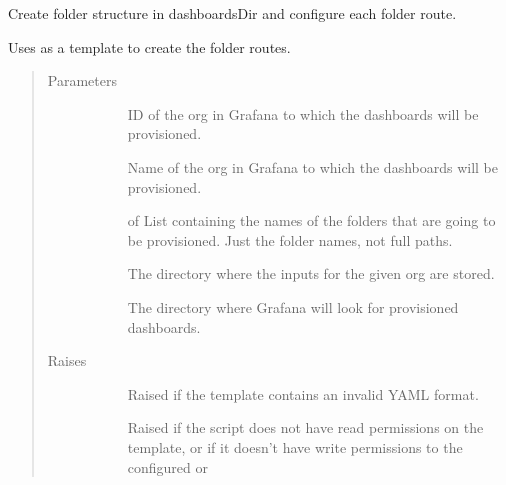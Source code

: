 \documentclass[letterpaper,10pt,english]{sphinxmanual}
\begin{document}
\begin{fulllineitems}
\label{\detokenize{inputs:gpInputs.provisionFolders}}
Create folder structure in dashboardsDir and configure each folder route.

Uses  as a template to create the folder
routes.
\begin{quote}\begin{description}
\item[{Parameters}] \leavevmode\begin{description}
\item[{}] \leavevmode{[}\sphinxtitleref{int}{]}
ID of the org in Grafana to which the dashboards will be provisioned.

\item[{}] \leavevmode{[}\sphinxtitleref{str}{]}
Name of the org in Grafana to which the dashboards will be provisioned.

\item[{}] \leavevmode{[} of \sphinxtitleref{str}{]}
List containing the names of the folders that are going to be provisioned.
Just the folder names, not full paths.

\item[{}] \leavevmode{[}\sphinxtitleref{str}{]}
The directory where the inputs for the given org are stored.

\item[{}] \leavevmode{[}\sphinxtitleref{str}{]}
The directory where Grafana will look for provisioned dashboards.

\end{description}

\item[{Raises}] \leavevmode\begin{description}
\item[{}] \leavevmode
Raised if the template contains an invalid YAML format.

\item[{}] \leavevmode
Raised if the script does not have read permissions on the template, or
if it doesn’t have write permissions to the configured  or


\end{description}
\end{description}
\end{quote}
\end{fulllineitems}
\end{document}

